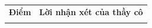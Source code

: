 \documentclass{article}
\begin{document}
\noindent
\begin{tabular}{|p{3.5cm}|p{12.2cm}|}
\hline
\centering\textbf{Điểm} & \centering\textbf{Lời nhận xét của thầy cô} \tabularnewline
\rule{0pt}{2.2cm} & \tabularnewline
\hline
\end{tabular}
\end{document}
